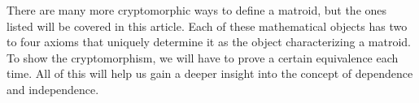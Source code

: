 There are many more cryptomorphic ways to define a matroid, but the ones listed will be covered in this article. Each of these mathematical objects has two to four axioms that uniquely determine it as the object characterizing a matroid. To show the cryptomorphism, we will have to prove a certain equivalence each time. All of this will help us gain a deeper insight into the concept of dependence and independence.